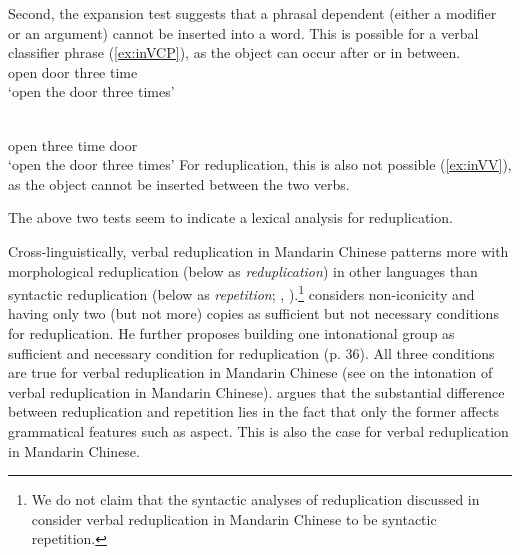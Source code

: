 Second, the expansion test suggests that a phrasal dependent (either a modifier or an argument) cannot be inserted into a word.
This is possible for a verbal classifier phrase (\ref{ex:inVCP}), as the object can occur after or in between.
\ea\label{ex:inVCP}%
\ea\label{ex:inVCPa} \gll {}   \\
open door three time\\
\glt `open the door three times'

\ex  \gll {}    \\
open three time door\\
\glt `open the door three times'
\z\z
For reduplication, this is also not possible (\ref{ex:inVV}), as the object cannot be inserted between the two verbs.
\ea\label{ex:inVV}

\z\z
The above two tests seem to indicate a lexical analysis for reduplication.

Cross-linguistically, verbal reduplication in Mandarin Chinese patterns more with morphological reduplication (below as \textit{reduplication}) in other languages
than syntactic reduplication (below as \textit{repetition}; \citealt[31]{Gil2005}, \citealt[1--2]{Forza2016}).\footnote{
We do not claim that the syntactic analyses of reduplication discussed in  consider verbal reduplication in Mandarin Chinese to be syntactic repetition.
}
\citet[35--36]{Gil2005} considers non-iconicity and having only two (but not more) copies as sufficient but not necessary conditions for reduplication.
He further proposes building one intonational group as sufficient and necessary condition for reduplication (p. 36).
All three conditions are true for verbal reduplication in Mandarin Chinese (see \citealt[154]{Sui2018} on the intonation of verbal reduplication in Mandarin Chinese).
\citet[9]{Forza2016} argues that the substantial difference between reduplication and repetition lies in the fact that only the former affects grammatical features such as aspect.
This is also the case for verbal reduplication in Mandarin Chinese.

